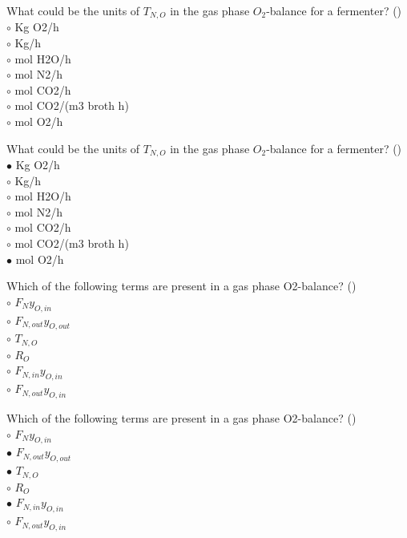 \documentclass[]{beamer}
\begin{document}
\begin{frame}[shrink] {}
\addtocounter{questions}{1}
\color{blue}
What could be the units of $T_{N,O}$ in the gas phase $O_2$-balance for a fermenter? ()\\
\color{black}
\setlength{\parindent}{-0.4cm}
{\color{red}$\circ$} Kg O2/h  \\
{\color{red}$\circ$} Kg/h  \\
{\color{red}$\circ$} mol H2O/h\\
{\color{red}$\circ$} mol N2/h  \\
{\color{red}$\circ$} mol CO2/h \\
{\color{red}$\circ$} mol CO2/(m3 broth h) \\
{\color{red}$\circ$} mol O2/h
\end{frame}
\begin{frame}[shrink] {}
\addtocounter{answers}{1}
\color{blue}
What could be the units of $T_{N,O}$ in the gas phase $O_2$-balance for a fermenter? ()\\
\color{black}
\setlength{\parindent}{-0.4cm}
{\color{red}$\bullet$} Kg O2/h  \\
{\color{red}$\circ$} Kg/h  \\
{\color{red}$\circ$} mol H2O/h\\
{\color{red}$\circ$} mol N2/h  \\
{\color{red}$\circ$} mol CO2/h \\
{\color{red}$\circ$} mol CO2/(m3 broth h) \\
{\color{red}$\bullet$} mol O2/h
\end{frame}

\begin{frame}[shrink] {}
\addtocounter{questions}{1}
\color{blue}
Which of the following terms are present in a gas phase O2-balance?  ()\\
\color{black}
\setlength{\parindent}{-0.4cm}
{\color{red}$\circ$}   $F_{N}y_{O,in}$\\
{\color{red}$\circ$}   $F_{N,out}y_{O,out}$\\
{\color{red}$\circ$} $T_{N,O}$\\
{\color{red}$\circ$} $R_O$\\
{\color{red}$\circ$}   $F_{N,in}y_{O,in}$  \\
{\color{red}$\circ$}   $F_{N,out}y_{O,in}$
\end{frame}
\begin{frame}[shrink] {}
\addtocounter{answers}{1}
\color{blue}
Which of the following terms are present in a gas phase O2-balance?  ()\\
\color{black}
\setlength{\parindent}{-0.4cm}
{\color{red}$\circ$}   $F_{N}y_{O,in}$\\
{\color{red}$\bullet$}   $F_{N,out}y_{O,out}$\\
{\color{red}$\bullet$} $T_{N,O}$\\
{\color{red}$\circ$} $R_O$\\
{\color{red}$\bullet$}   $F_{N,in}y_{O,in}$  \\
{\color{red}$\circ$}   $F_{N,out}y_{O,in}$
\end{frame}
\end{document}
